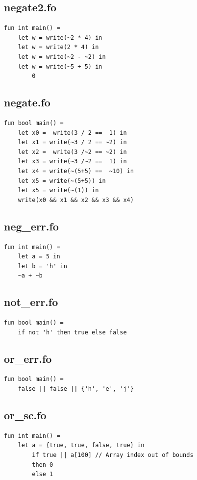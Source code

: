 \documentclass[11pt]{article}
\begin{document}
    \subsection{negate2.fo}
    \begin{lstlisting}[basicstyle=\small]
fun int main() =
    let w = write(~2 * 4) in
    let w = write(2 * 4) in
    let w = write(~2 - ~2) in
    let w = write(~5 + 5) in
        0
    \end{lstlisting}

    \subsection{negate.fo}
    \begin{lstlisting}[basicstyle=\small]
fun bool main() =
    let x0 =  write(3 / 2 ==  1) in
    let x1 = write(~3 / 2 == ~2) in
    let x2 =  write(3 /~2 == ~2) in
    let x3 = write(~3 /~2 ==  1) in
    let x4 = write(~(5+5) ==  ~10) in
    let x5 = write(~(5+5)) in
    let x5 = write(~(1)) in
    write(x0 && x1 && x2 && x3 && x4)
    \end{lstlisting}

    \subsection{neg\_err.fo}
    \begin{lstlisting}[basicstyle=\small]
fun int main() =
    let a = 5 in
    let b = 'h' in
    ~a + ~b
    \end{lstlisting}

    \subsection{not\_err.fo}
    \begin{lstlisting}[basicstyle=\small]
fun bool main() =
    if not 'h' then true else false
    \end{lstlisting}

    \subsection{or\_err.fo}
    \begin{lstlisting}[basicstyle=\small]
fun bool main() =
    false || false || {'h', 'e', 'j'}
    \end{lstlisting}

    \subsection{or\_sc.fo}
    \begin{lstlisting}[basicstyle=\small]
fun int main() =
    let a = {true, true, false, true} in
        if true || a[100] // Array index out of bounds
        then 0
        else 1
    \end{lstlisting}
\end{document}
